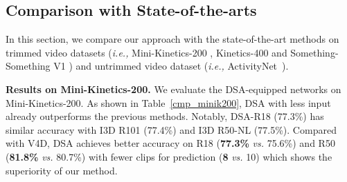 \documentclass[sigconf]{acmart}
\begin{document}
{{\subsection{Comparison with State-of-the-arts}
In this section, we compare our approach with the state-of-the-art methods on trimmed video datasets (\emph{i.e.,} Mini-Kinetics-200 \cite{s3d}, Kinetics-400 \cite{kay2017kinetics} and Something-Something V1 \cite{sth-sth}) and untrimmed video dataset (\emph{i.e.,} ActivityNet~\cite{caba2015activitynet}).

\textbf{Results on Mini-Kinetics-200.} 
We evaluate the DSA-equipped networks on Mini-Kinetics-200. 
As shown in Table~\ref{cmp_minik200}, DSA with less input already outperforms the previous methods. Notably, DSA-R18 (77.3\%) has similar accuracy with I3D R101 (77.4\%) and I3D R50-NL (77.5\%). Compared with V4D, DSA achieves better accuracy on R18 (\textbf{77.3\%} \emph{vs.} 75.6\%) and R50 (\textbf{81.8\%} \emph{vs.} 80.7\%) with fewer clips for prediction (\textbf{8} \emph{vs.} 10) which shows the superiority of our method.






}}
\end{document}
